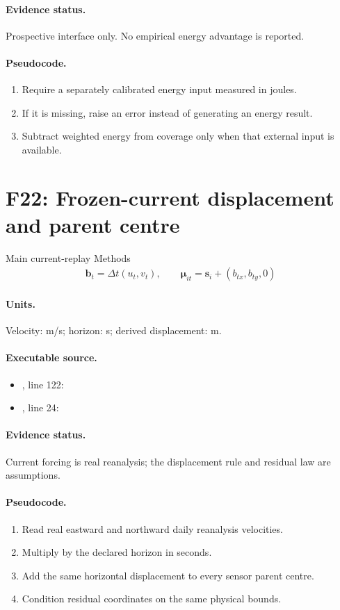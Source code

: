 \documentclass[10pt]{article}
\begin{document}
\paragraph{Evidence status.} Prospective interface only. No empirical energy advantage is reported.
\paragraph{Pseudocode.}
\begin{enumerate}[leftmargin=*]
\item Require a separately calibrated energy input measured in joules.
\item If it is missing, raise an error instead of generating an energy result.
\item Subtract weighted energy from coverage only when that external input is available.
\end{enumerate}
\newpage
\section*{F22: Frozen-current displacement and parent centre}
Main current-replay Methods
\begin{gather*}\mathbf b_t=\Delta t(u_t,v_t),\qquad\boldsymbol\mu_{it}=\mathbf s_i+(b_{tx},b_{ty},0)\end{gather*}
\paragraph{Units.} Velocity: m/s; horizon: s; derived displacement: m.
\paragraph{Executable source.}
\begin{itemize}[leftmargin=*]
\item {}, line 122: 
\item {}, line 24: 
\end{itemize}
\paragraph{Evidence status.} Current forcing is real reanalysis; the displacement rule and residual law are assumptions.
\paragraph{Pseudocode.}
\begin{enumerate}[leftmargin=*]
\item Read real eastward and northward daily reanalysis velocities.
\item Multiply by the declared horizon in seconds.
\item Add the same horizontal displacement to every sensor parent centre.
\item Condition residual coordinates on the same physical bounds.
\end{enumerate}
\newpage
\end{document}

